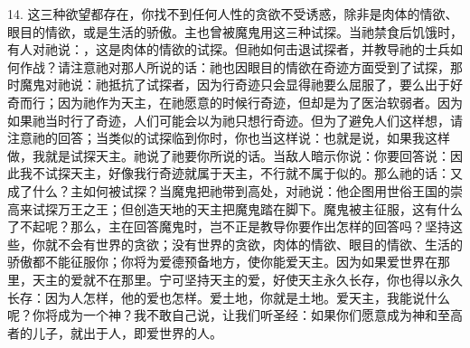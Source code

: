 14. 这三种欲望都存在，你找不到任何人性的贪欲不受诱惑，除非是肉体的情欲、眼目的情欲，或是生活的骄傲。主也曾被魔鬼用这三种试探。当祂禁食后饥饿时，有人对祂说：，这是肉体的情欲的试探。但祂如何击退试探者，并教导祂的士兵如何作战？请注意祂对那人所说的话：祂也因眼目的情欲在奇迹方面受到了试探，那时魔鬼对祂说：祂抵抗了试探者，因为行奇迹只会显得祂要么屈服了，要么出于好奇而行；因为祂作为天主，在祂愿意的时候行奇迹，但却是为了医治软弱者。因为如果祂当时行了奇迹，人们可能会以为祂只想行奇迹。但为了避免人们这样想，请注意祂的回答；当类似的试探临到你时，你也当这样说：也就是说，如果我这样做，我就是试探天主。祂说了祂要你所说的话。当敌人暗示你说：你要回答说：因此我不试探天主，好像我行奇迹就属于天主，不行就不属于似的。那么祂的话：又成了什么？主如何被试探？当魔鬼把祂带到高处，对祂说：他企图用世俗王国的崇高来试探万王之王；但创造天地的天主把魔鬼踏在脚下。魔鬼被主征服，这有什么了不起呢？那么，主在回答魔鬼时，岂不正是教导你要作出怎样的回答吗？坚持这些，你就不会有世界的贪欲；没有世界的贪欲，肉体的情欲、眼目的情欲、生活的骄傲都不能征服你；你将为爱德预备地方，使你能爱天主。因为如果爱世界在那里，天主的爱就不在那里。宁可坚持天主的爱，好使天主永久长存，你也得以永久长存：因为人怎样，他的爱也怎样。爱土地，你就是土地。爱天主，我能说什么呢？你将成为一个神？我不敢自己说，让我们听圣经：如果你们愿意成为神和至高者的儿子，就出于人，即爱世界的人。\par


